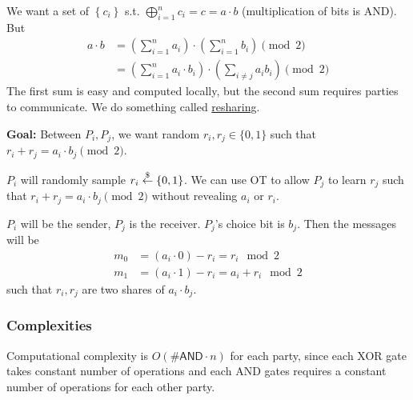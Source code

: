 We want a set of $\left\{ c_i \right\}$ s.t. $\bigoplus^n_{i=1}c_i = c = a \cdot b$ (multiplication of bits is \textsf{AND}). But
\begin{align*}
    a\cdot b
     & = \left( \sum^n_{i=1}a_i \right)\cdot \left( \sum^n_{i=1}b_i \right)\pmod{2}                \\
     & = \left( \sum^n_{i=1}a_i\cdot b_i \right)\cdot \left( \sum_{i\neq j}a_i b_i \right)\pmod{2}
\end{align*}
The first sum is easy and computed locally, but the second sum requires parties to communicate. We do something called \ul{resharing}.

\textbf{Goal:} Between $P_i, P_j$, we want random $r_i, r_j\in\{0, 1\}$ such that $r_i + r_j = a_i \cdot b_j \pmod{2}$.

$P_i$ will randomly sample $r_i\overset{\$}{\leftarrow} \left\{ 0, 1 \right\}$. We can use OT to allow $P_j$ to learn $r_j$ such that $r_i + r_j = a_i\cdot b_j\pmod{2}$ without revealing $a_i$ or $r_i$.

$P_i$ will be the sender, $P_j$ is the receiver. $P_j$'s choice bit is $b_j$. Then the messages will be
\begin{align*}
    m_0 & = (a_i\cdot 0) - r_i = r_i \mod 2\\
    m_1 & = (a_i\cdot 1) - r_i = a_i + r_i \mod 2
\end{align*}
such that $r_i, r_j$ are two shares of $a_i\cdot b_j$.


\subsubsection{Complexities}
Computational complexity is $O(\#\mathsf{AND}\cdot n)$ for each party, since each XOR gate takes constant number of operations and each AND gates requires a constant number of operations for each other party.

